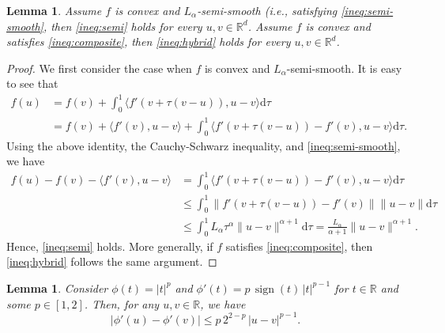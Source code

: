 \documentclass[11pt,letterpaper]{article}
\newtheorem{lemma}[thm]{Lemma}
\newcommand{\R}{\mathbb{R}}
\newcommand{\inner}[2]{\langle #1,#2\rangle}
\newcommand{\rd}{\mathrm{d}}
\begin{document}
\begin{lemma}\label{lem:tech}
Assume $f$ is convex and $L_\alpha$-semi-smooth (i.e., satisfying \eqref{ineq:semi-smooth}, then \eqref{ineq:semi} holds for every $u,v \in \R^d$.
Assume $f$ is convex and satisfies \eqref{ineq:composite}, then \eqref{ineq:hybrid} holds for every $u,v \in \R^d$.
\end{lemma}
\begin{proof}
We first consider the case when $f$ is convex and $L_\alpha$-semi-smooth.
It is easy to see that
		\begin{align*}
			f(u)&=f(v)+\int_{0}^{1} \inner{f'(v+\tau (v-u))} {u-v} \rd\tau \\
			&=f(v) + \inner{f'(v)}{u-v}+\int_{0}^{1} \inner{f'(v+\tau (v-u)) - f'(v)} {u-v} \rd\tau.
		\end{align*}
Using the above identity, the Cauchy-Schwarz inequality, and \eqref{ineq:semi-smooth}, we have
		\begin{align*}
			f(u) - f(v) - \inner{f'(v)}{u-v} 
			&= \int_{0}^{1}  \inner{f'(v+\tau (v-u)) - f'(v)} {u-v} \rd\tau \\
			&\le \int_{0}^{1} \left\| f'(v+\tau (v-u)) - f'(v)\right\| \|u-v\|  \rd\tau \\
			&\le \int_{0}^{1}  L_\alpha \tau^\alpha \|u-v\|^{\alpha+1}  \rd\tau
		= \frac{L_\alpha}{\alpha+1}\|u-v\|^{\alpha+1}.
		\end{align*}
Hence, \eqref{ineq:semi} holds. More generally, if $f$ satisfies \eqref{ineq:composite}, then  \eqref{ineq:hybrid} follows the same argument.
\end{proof}

\begin{lemma}\label{lem:Lip}
    Consider $\phi(t) = |t|^p$ and $\phi'(t) = p\,\operatorname{sign}(t)\,|t|^{p-1}$ for $t\in \R$ and some $p\in [1,2]$. Then, for any $u,v \in \R$, we have 
    \[
    |\phi'(u)-\phi'(v)| \le p\,2^{2-p}\,|u-v|^{p-1}.
    \]
\end{lemma}
\end{document}
